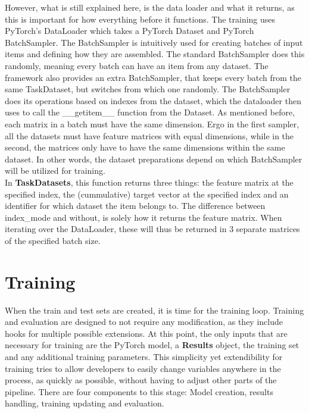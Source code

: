 However, what is still explained here, is the data loader and what it returns, as this is important for how everything before it functions. The training uses PyTorch's DataLoader which takes a PyTorch Dataset and PyTorch BatchSampler. The BatchSampler is intuitively used for creating batches of input items and defining how they are assembled. The standard BatchSampler does this randomly, meaning every batch can have an item from any dataset. The framework also provides an extra BatchSampler, that keeps every batch from the same TaskDataset, but switches from which one randomly. The BatchSampler does its operations based on indexes from the dataset, which the dataloader then uses to call the \_\_getitem\_\_ function from the Dataset. As mentioned before, each matrix in a batch must have the same dimension. Ergo in the first sampler, all the datasets must have feature matrices with equal dimensions, while in the second, the matrices only have to have the same dimensions within the same dataset. In other words, the dataset preparations depend on which BatchSampler will be utilized for training.\\

In \textbf{TaskDatasets}, this function returns three things: the feature matrix at the specified index, the (cummulative) target vector at the specified index and an identifier for which dataset the item belongs to. The difference between index\_mode and without, is solely how it returns the feature matrix. When iterating over the DataLoader, these will thus be returned in 3 separate matrices of the specified batch size. \\


\section{Training} \label{Impl:Training}

When the train and test sets are created, it is time for the training loop. Training and evaluation are designed to not require any modification, as they include hooks for multiple possible extensions. At this point, the only inputs that are necessary for training are the PyTorch model, a \textbf{Results} object, the training set and any additional training parameters. This simplicity yet extendibility for training tries to allow developers to easily change variables anywhere in the process, as quickly as possible, without having to adjust other parts of the pipeline. There are four components to this stage: Model creation, results handling, training updating and evaluation. \\

